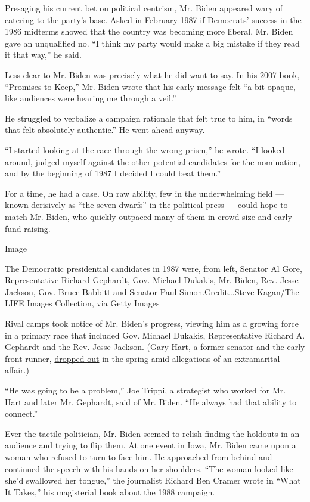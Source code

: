 Presaging his current bet on political centrism, Mr. Biden appeared wary
of catering to the party's base. Asked in February 1987 if Democrats'
success in the 1986 midterms showed that the country was becoming more
liberal, Mr. Biden gave an unqualified no. ``I think my party would make
a big mistake if they read it that way,'' he said.

Less clear to Mr. Biden was precisely what he did want to say. In his
2007 book, ``Promises to Keep,'' Mr. Biden wrote that his early message
felt ``a bit opaque, like audiences were hearing me through a veil.''

He struggled to verbalize a campaign rationale that felt true to him, in
``words that felt absolutely authentic.'' He went ahead anyway.

``I started looking at the race through the wrong prism,'' he wrote. ``I
looked around, judged myself against the other potential candidates for
the nomination, and by the beginning of 1987 I decided I could beat
them.''

For a time, he had a case. On raw ability, few in the underwhelming
field --- known derisively as ``the seven dwarfs'' in the political
press --- could hope to match Mr. Biden, who quickly outpaced many of
them in crowd size and early fund-raising.

Image

The Democratic presidential candidates in 1987 were, from left, Senator
Al Gore, Representative Richard Gephardt, Gov. Michael Dukakis, Mr.
Biden, Rev. Jesse Jackson, Gov. Bruce Babbitt and Senator Paul
Simon.Credit...Steve Kagan/The LIFE Images Collection, via Getty Images

Rival camps took notice of Mr. Biden's progress, viewing him as a
growing force in a primary race that included Gov. Michael Dukakis,
Representative Richard A. Gephardt and the Rev. Jesse Jackson. (Gary
Hart, a former senator and the early front-runner,
\href{https://www.nytimes.com/1987/05/09/us/hart-drops-race-for-white-house-in-a-defiant-mood.html}{dropped
out} in the spring amid allegations of an extramarital affair.)

``He was going to be a problem,'' Joe Trippi, a strategist who worked
for Mr. Hart and later Mr. Gephardt, said of Mr. Biden. ``He always had
that ability to connect.''

Ever the tactile politician, Mr. Biden seemed to relish finding the
holdouts in an audience and trying to flip them. At one event in Iowa,
Mr. Biden came upon a woman who refused to turn to face him. He
approached from behind and continued the speech with his hands on her
shoulders. ``The woman looked like she'd swallowed her tongue,'' the
journalist Richard Ben Cramer wrote in ``What It Takes,'' his
magisterial book about the 1988 campaign.

